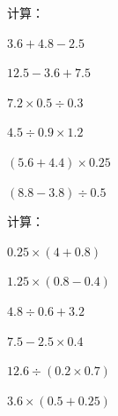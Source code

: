 \documentclass[a4paper,12pt]{ctexart}
\begin{document}
\begin{exercise}
\item 计算：
  \begin{subexercise}
    \item $3.6+4.8-2.5$
    \item $12.5-3.6+7.5$
    \item $7.2\times0.5\div0.3$
    \item $4.5\div0.9\times1.2$
    \item $(5.6+4.4)\times0.25$
    \item $(8.8-3.8)\div0.5$
  \end{subexercise}

\item 计算：
  \begin{subexercise}
    \item $0.25\times(4+0.8)$
    \item $1.25\times(0.8-0.4)$
    \item $4.8\div0.6+3.2$
    \item $7.5-2.5\times0.4$
    \item $12.6\div(0.2\times0.7)$
    \item $3.6\times(0.5+0.25)$
  \end{subexercise}
\end{exercise}

\newpage



\bigskip
\end{document}
